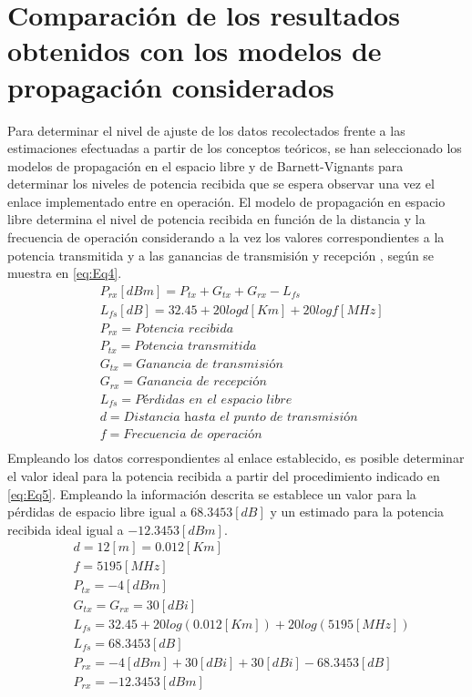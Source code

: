 \documentclass[conference]{IEEEtran}
\begin{document}
\section{Comparación de los resultados obtenidos con los modelos de propagación considerados}
Para determinar el nivel de ajuste de los datos recolectados frente a las estimaciones efectuadas a partir de 
los conceptos teóricos, se han seleccionado los modelos de propagación en el espacio libre y de Barnett-Vignants
para determinar los niveles de potencia recibida que se espera observar una vez el enlace implementado entre en operación.
El modelo de propagación en espacio libre determina el nivel de potencia recibida en función de la distancia y la 
frecuencia de operación considerando a la vez los valores correspondientes a la potencia transmitida y a las ganancias
de transmisión y recepción \cite{b2}, según se muestra en \ref{eq:Eq4}. 
\begin{equation}
    \label{eq:Eq4}
    \begin{aligned}
        &P_{rx}[dBm] = P_{tx} + G_{tx} + G_{rx} - L_{fs}\\
        &L_{fs}[dB] = 32.45+20logd[Km]+20logf[MHz]\\
        &P_{rx} = \textit{Potencia recibida}\\
        &P_{tx} = \textit{Potencia transmitida}\\
        &G_{tx} = \textit{Ganancia de transmisión}\\
        &G_{rx} = \textit{Ganancia de recepción}\\
        &L_{fs} = \textit{Pérdidas en el espacio libre}\\
        &d = \textit{Distancia hasta el punto de transmisión}\\
        &f = \textit{Frecuencia de operación}\\
    \end{aligned}
\end{equation}
Empleando los datos correspondientes al enlace establecido, es posible determinar el valor ideal para la potencia recibida 
a partir del procedimiento indicado en \ref{eq:Eq5}. Empleando la información descrita se establece un valor para la pérdidas de espacio libre
igual a $68.3453[dB]$ y un estimado para la potencia recibida ideal igual a $-12.3453[dBm]$.
\begin{equation}
    \label{eq:Eq5}
    \begin{aligned}
        &d = 12[m] = 0.012[Km]\\
        &f = 5195[MHz]\\
        &P_{tx} = -4[dBm]\\
        &G_{tx} = G_{rx} = 30[dBi]\\
        &L_{fs} = 32.45+20log(0.012[Km])+20log(5195[MHz])\\
        &L_{fs} = 68.3453[dB]\\
        &P_{rx} = -4[dBm] + 30[dBi] + 30[dBi] - 68.3453[dB]\\
        &P_{rx} = -12.3453[dBm]
    \end{aligned}
\end{equation}
\end{document}
